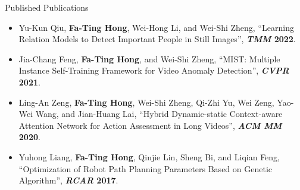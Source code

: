 \documentclass{resume} %
\begin{document}
\begin{rSection}{Published Publications}
\begin{itemize}[leftmargin=10pt]
    \item Yu-Kun Qiu, \textbf{Fa-Ting Hong}, Wei-Hong Li, and Wei-Shi Zheng, ``Learning Relation Models to Detect Important People in Still Images'', \textbf{\textit{TMM} 2022}.
    \vspace{-5pt}

    \item Jia-Chang Feng, \textbf{Fa-Ting Hong}, and Wei-Shi Zheng, ``MIST: Multiple Instance Self-Training Framework for Video Anomaly Detection'', \textbf{\textit{CVPR} 2021}.
    \vspace{-5pt}

    \item Ling-An Zeng, \textbf{Fa-Ting Hong}, Wei-Shi Zheng, Qi-Zhi Yu, Wei Zeng, Yao-Wei Wang, and Jian-Huang Lai, ``Hybrid Dynamic-static Context-aware Attention Network for Action Assessment in Long Videos'', \textbf{\textit{ACM MM} 2020}.
    \vspace{-5pt}

    \item Yuhong Liang, \textbf{Fa-Ting Hong}, Qinjie Lin, Sheng Bi, and Liqian Feng, ``Optimization of Robot Path Planning Parameters Based on Genetic Algorithm'', \textbf{\textit{RCAR} 2017}.
    \vspace{-5pt}
    \end{itemize}
\end{rSection}
\end{document}
